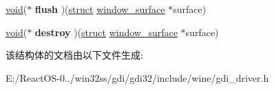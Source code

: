 \begin{DoxyCompactItemize}
\item 
\mbox{\label{structwindow__surface__funcs_af070be707bcefe557413e345279445b6}} 
\hyperlink{interfacevoid}{void}($\ast$ {\bfseries flush} )(\hyperlink{interfacestruct}{struct} \hyperlink{structwindow__surface}{window\+\_\+surface} $\ast$surface)
\item 
\mbox{\label{structwindow__surface__funcs_a5354b91cbfe74e7d8f5a28acde6ab0aa}} 
\hyperlink{interfacevoid}{void}($\ast$ {\bfseries destroy} )(\hyperlink{interfacestruct}{struct} \hyperlink{structwindow__surface}{window\+\_\+surface} $\ast$surface)
\end{DoxyCompactItemize}


该结构体的文档由以下文件生成\+:\begin{DoxyCompactItemize}
\item 
E\+:/\+React\+O\+S-\/0../win32ss/gdi/gdi32/include/wine/gdi\+\_\+driver.\+h\end{DoxyCompactItemize}
